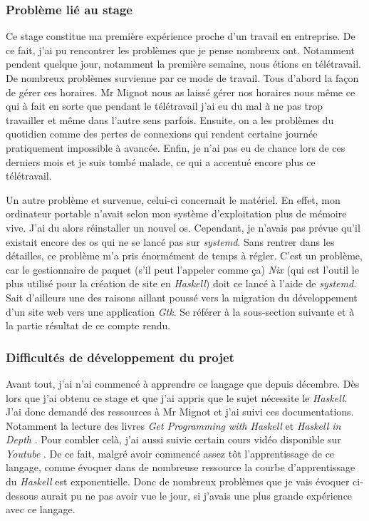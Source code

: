 \subsubsection{Problème lié au stage}

Ce stage constitue ma première expérience proche d'un travail en entreprise. De 
ce fait, j'ai pu rencontrer les problèmes que je pense nombreux ont. Notamment 
pendent quelque jour, notamment la première semaine, nous étions en télétravail.
De nombreux problèmes survienne par ce mode de travail. Tous d'abord la façon de 
gérer ces horaires. Mr Mignot nous as laissé gérer nos horaires nous même ce qui 
à fait en sorte que pendant le télétravail j'ai eu du mal à ne pas trop 
travailler et même dans l'autre sens parfois. Ensuite, on a les problèmes du 
quotidien comme des pertes de connexions qui rendent certaine journée 
pratiquement impossible à avancée. Enfin, je n'ai pas eu de chance lors de ces 
derniers mois et je suis tombé malade, ce qui a accentué encore plus ce 
télétravail.

\newpage

Un autre problème et survenue, celui-ci concernait le matériel. En effet, mon 
ordinateur portable n'avait selon mon système d'exploitation plus de mémoire 
vive. J'ai du alors réinstaller un nouvel os. Cependant, je n'avais pas prévue 
qu'il existait encore des os qui ne se lancé pas sur \textit{systemd}. Sans 
rentrer dans les détailles, ce problème m’a pris énormément de temps à régler. 
C'est un problème, car le gestionnaire de paquet (s'il peut l'appeler comme ça)
\textit{Nix} (qui est l'outil le plus utilisé pour la création de site en 
\textit{Haskell}) doit ce lancé à l'aide de \textit{systemd}. Sait d'ailleurs 
une des raisons aillant poussé vers la migration du développement d'un site web 
vers une application \textit{Gtk}. Se référer à la sous-section suivante et à la 
partie résultat de ce compte rendu. 

\subsubsection{Difficultés de développement du projet}

Avant tout, j'ai n'ai commencé à apprendre ce langage que depuis décembre. 
Dès lors que j'ai obtenu ce stage et que j'ai appris que le sujet nécessite le 
\textit{Haskell}. J'ai donc demandé des ressources à Mr Mignot et j'ai suivi 
ces documentations. Notamment la lecture des livres 
\textit{Get Programming with Haskell} et \textit{Haskell in Depth}
\cite{bookWithHaskell, haskellInDepth}. Pour combler celà, j'ai aussi suivie 
certain cours vidéo disponible sur \textit{Youtube}
\cite{playHaksell1, playHaksell2}. De ce fait, malgré avoir commencé assez 
tôt l'apprentissage de ce langage, comme évoquer dans de nombreuse ressource la 
courbe d'apprentissage du \textit{Haskell} est exponentielle. Donc de nombreux 
problèmes que je vais évoquer ci-dessous aurait pu ne pas avoir vue le jour, si 
j'avais une plus grande expérience avec ce langage.

